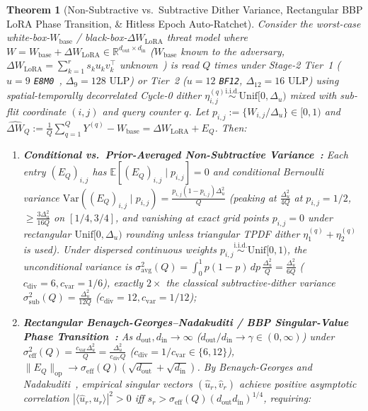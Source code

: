 \documentclass[10pt,twocolumn]{article}
\theoremstyle{spectralthm}
\newtheorem{theorem}{Theorem}[section]
\begin{document}
\begin{theorem}[Non-Subtractive vs.\ Subtractive Dither Variance, Rectangular BBP LoRA Phase Transition, \& Hitless Epoch Auto-Ratchet]
\label{thm:bbp_spectral_wall}
Consider the worst-case white-box-$W_{\mathrm{base}}$ / black-box-$\Delta W_{\mathrm{LoRA}}$ threat model where $W = W_{\mathrm{base}} + \Delta W_{\mathrm{LoRA}} \in \mathbb{R}^{d_{\mathrm{out}} \times d_{\mathrm{in}}}$ ($W_{\mathrm{base}}$ known to the adversary, $\Delta W_{\mathrm{LoRA}} = \sum_{k=1}^r s_k u_k v_k^\top$ unknown~\cite{hu2022lora}) is read $Q$ times under Stage-2 Tier~1 ($u=9$ \texttt{E8M0}~\cite{rouhani2023microscaling}, $\Delta_9 = 128\text{~ULP}$) or Tier~2 ($u=12$ \texttt{BF12}, $\Delta_{12} = 16\text{~ULP}$) using spatial-temporally decorrelated Cycle-0 dither $\eta_{i,j}^{(q)} \stackrel{\mathrm{i.i.d.}}{\sim} \mathrm{Unif}[0, \Delta_u)$ mixed with sub-flit coordinate $(i,j)$ and query counter $q$. Let $p_{i,j} := \{W_{i,j}/\Delta_u\} \in [0,1)$ and $\widehat{\Delta W}_Q := \frac{1}{Q}\sum_{q=1}^Q Y^{(q)} - W_{\mathrm{base}} = \Delta W_{\mathrm{LoRA}} + E_Q$. Then:
\begin{enumerate}
  \item[(i)] \textbf{Conditional vs.\ Prior-Averaged Non-Subtractive Variance~\cite{schuchman1964dither,gray1993dithered,wannamaker2000nonsubtractive}:} Each entry $(E_Q)_{i,j}$ has $\mathbb{E}[(E_Q)_{i,j} \mid p_{i,j}] = 0$ and conditional Bernoulli variance $\mathrm{Var}((E_Q)_{i,j} \mid p_{i,j}) = \frac{p_{i,j}(1 - p_{i,j})\Delta_u^2}{Q}$ (peaking at $\frac{\Delta_u^2}{4Q}$ at $p_{i,j}=1/2$, $\ge \frac{3\Delta_u^2}{16Q}$ on $[1/4,3/4]$, and vanishing at exact grid points $p_{i,j}=0$ under rectangular $\mathrm{Unif}[0,\Delta_u)$ rounding unless triangular TPDF dither $\eta_1^{(q)}+\eta_2^{(q)}$~\cite{wannamaker2000nonsubtractive} is used). Under dispersed continuous weights $p_{i,j} \stackrel{\mathrm{i.i.d.}}{\sim} \mathrm{Unif}[0,1)$, the unconditional variance is $\sigma_{\mathrm{avg}}^2(Q) = \int_0^1 p(1-p)\,dp\,\frac{\Delta_u^2}{Q} = \frac{\Delta_u^2}{6Q}$ ($c_{\mathrm{div}} = 6, c_{\mathrm{var}} = 1/6$), exactly $2\times$ the classical subtractive-dither variance $\sigma_{\mathrm{sub}}^2(Q) = \frac{\Delta_u^2}{12Q}$ ($c_{\mathrm{div}} = 12, c_{\mathrm{var}} = 1/12$);
  \item[(ii)] \textbf{Rectangular Benaych-Georges--Nadakuditi / BBP Singular-Value Phase Transition~\cite{marchenko1967distribution,baik2005phase,benaych2012singular,gavish2014optimal}:} As $d_{\mathrm{out}}, d_{\mathrm{in}} \to \infty$ ($d_{\mathrm{out}}/d_{\mathrm{in}} \to \gamma \in (0,\infty)$) under $\sigma_{\mathrm{eff}}^2(Q) = \frac{c_{\mathrm{var}}\Delta_u^2}{Q} = \frac{\Delta_u^2}{c_{\mathrm{div}} Q}$ ($c_{\mathrm{div}} = 1/c_{\mathrm{var}} \in \{6, 12\}$), $\|E_Q\|_{\mathrm{op}} \to \sigma_{\mathrm{eff}}(Q)(\sqrt{d_{\mathrm{out}}} + \sqrt{d_{\mathrm{in}}})$. By Benaych-Georges and Nadakuditi~\cite[Thm.~2.8]{benaych2012singular}, empirical singular vectors $(\hat{u}_r, \hat{v}_r)$ achieve positive asymptotic correlation $|\langle \hat{u}_r, u_r \rangle|^2 > 0$ iff $s_r > \sigma_{\mathrm{eff}}(Q)(d_{\mathrm{out}} d_{\mathrm{in}})^{1/4}$, requiring:

\end{enumerate}
\end{theorem}
\end{document}
